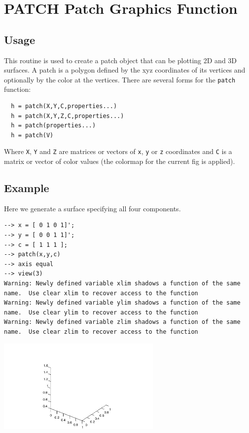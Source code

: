 \section{PATCH Patch Graphics Function}

\subsection{Usage}

This routine is used to create a patch object that can be plotting 2D and 3D surfaces.  A 
patch is a polygon defined by the xyz coordinates
of its vertices and optionally by the color at the vertices.
There are several forms for the \verb|patch| function:
\begin{verbatim}
  h = patch(X,Y,C,properties...)
  h = patch(X,Y,Z,C,properties...)
  h = patch(properties...)
  h = patch(V)
\end{verbatim}
Where \verb|X|, \verb|Y| and \verb|Z| are matrices or vectors of \verb|x|, \verb|y| or \verb|z| coordinates
and \verb|C| is a matrix or vector of color values (the colormap
for the current fig is applied).  
\subsection{Example}

Here we generate a surface specifying all four components.
\begin{verbatim}
--> x = [ 0 1 0 1]';
--> y = [ 0 0 1 1]';
--> c = [ 1 1 1 ];
--> patch(x,y,c)
--> axis equal
--> view(3)
Warning: Newly defined variable xlim shadows a function of the same name.  Use clear xlim to recover access to the function
Warning: Newly defined variable ylim shadows a function of the same name.  Use clear ylim to recover access to the function
Warning: Newly defined variable zlim shadows a function of the same name.  Use clear zlim to recover access to the function
\end{verbatim}


\centerline{\includegraphics[width=8cm]{patch1}}

